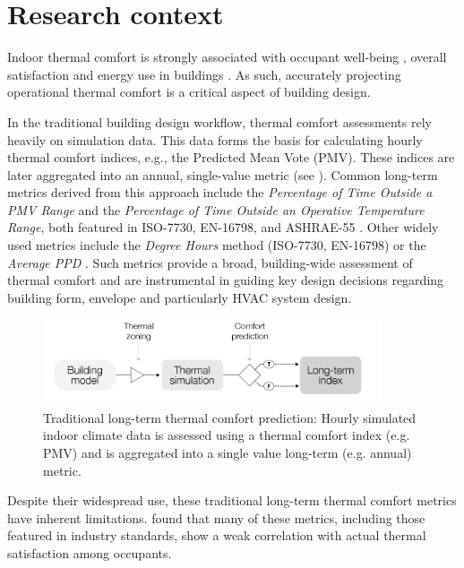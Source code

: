 
\section{Research context}

Indoor thermal comfort is strongly associated with occupant well-being \citep{altomonte_ten_2020}, overall satisfaction \citep{graham_lessons_2021} and energy use in buildings \citep{yang_thermal_2014}. As such, accurately projecting operational thermal comfort is a critical aspect of building design.

In the traditional building design workflow, thermal comfort assessments rely heavily on simulation data. This data forms the basis for calculating hourly thermal comfort indices, e.g., the Predicted Mean Vote (PMV). These indices are later aggregated into an annual, single-value metric (see ). Common long-term metrics derived from this approach include the \textit{Percentage of Time Outside a PMV Range} and the \textit{Percentage of Time Outside an Operative Temperature Range}, both featured in ISO-7730, EN-16798, and ASHRAE-55 \citep{iso_2005, cen_en_2019, ashrae_2020}. Other widely used metrics include the \textit{Degree Hours} method (ISO-7730, EN-16798) or the \textit{Average PPD} \citep{iso_2005}. Such metrics provide a broad, building-wide assessment of thermal comfort and are instrumental in guiding key design decisions regarding building form, envelope and particularly HVAC system design.

\begin{figure}[h!]
    \centering
    \includegraphics[width=10cm]{manuscript/src/figures/conventional-workflow.png}
    \caption{Traditional long-term thermal comfort prediction: Hourly simulated indoor climate data is assessed using a thermal comfort index (e.g. PMV) and is aggregated into a single value long-term (e.g. annual) metric. }
    \label{fig:typical-workflow}
\end{figure}

Despite their widespread use, these traditional long-term thermal comfort metrics have inherent limitations.\citet{li_improved_2020} found that many of these metrics, including those featured in industry standards, show a weak correlation with actual thermal satisfaction among occupants.

